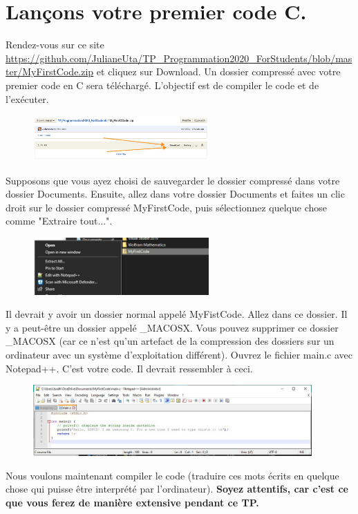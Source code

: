 \documentclass{article}
\begin{document}
\section{Lançons votre premier code C.}
Rendez-vous sur ce site \href{https://github.com/JulianeUta/TP_Programmation2020_ForStudents/blob/master/MyFirstCode.zip}{https://github.com/JulianeUta/TP\_Programmation2020\_ForStudents/blob/master/MyFirstCode.zip} et cliquez sur Download. Un dossier compressé avec votre premier code en C sera téléchargé. L'objectif est de compiler le code et de l'exécuter.
\begin{figure}[H]
\center
\includegraphics[width=0.6\textwidth]{Plots/FirstCode_1.png}
\end{figure}
Supposons que vous ayez choisi de sauvegarder le dossier compressé dans votre dossier Documents. Ensuite, allez dans votre dossier Documents et faites un clic droit sur le dossier compressé MyFirstCode, puis sélectionnez quelque chose comme "Extraire tout...".
\begin{figure}[H]
\center
\includegraphics[width=0.6\textwidth]{Plots/FirstCode_2.jpg}
\end{figure}
Il devrait y avoir un dossier normal appelé MyFistCode. Allez dans ce dossier. Il y a peut-être un dossier appelé \_MACOSX.  Vous pouvez supprimer ce dossier \_MACOSX (car ce n'est qu'un artefact de la compression des dossiers sur un ordinateur avec un système d'exploitation différent). Ouvrez le fichier main.c avec Notepad++. C'est votre code. Il devrait ressembler à ceci. 
\begin{figure}[H]
\center
\includegraphics[width=0.95\textwidth]{Plots/FirstCode_9.jpeg}
\end{figure}
Nous voulons maintenant compiler le code (traduire ces mots écrits en quelque chose qui puisse être interprété par l'ordinateur). {\color{Bittersweet}\textbf{Soyez attentifs, car c'est ce que vous ferez de manière extensive pendant ce TP.}}
\end{document}
